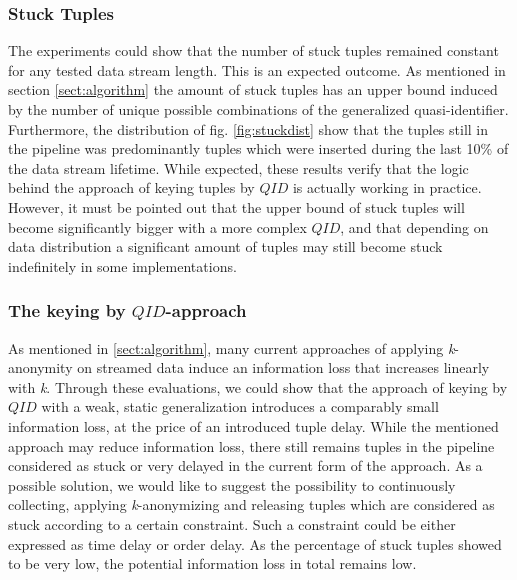 \subsubsection{Stuck Tuples} %
The experiments could show that the number of stuck tuples remained constant for any tested data stream length. This is an expected outcome. As mentioned in section \ref{sect:algorithm} the amount of stuck tuples has an upper bound induced by the number of unique possible combinations of the generalized quasi-identifier. Furthermore, the distribution of fig. \ref{fig:stuckdist} show that the tuples still in the pipeline was predominantly tuples which were inserted during the last 10\% of the data stream lifetime. While expected, these results verify that the logic behind the approach of keying tuples by $QID$ is actually working in practice. However, it must be pointed out that the upper bound of stuck tuples will become significantly bigger with a more complex $QID$, and that depending on data distribution a significant amount of tuples may still become stuck indefinitely in some implementations. 

\subsubsection{The keying by $QID$-approach} %
As mentioned in \ref{sect:algorithm}, many current approaches of applying \textit{k}-anonymity on streamed data induce an information loss that increases linearly with \textit{k}. Through these evaluations, we could show that the approach of keying by $QID$ with a weak, static generalization introduces a comparably small information loss, at the price of an introduced tuple delay. While the mentioned approach may reduce information loss, there still remains tuples in the pipeline considered as stuck or very delayed in the current form of the approach. As a possible solution, we would like to suggest the possibility to continuously collecting, applying \textit{k}-anonymizing and releasing tuples which are considered as stuck according to a certain constraint. Such a constraint could be either expressed as time delay or order delay. As the percentage of stuck tuples showed to be very low, the potential information loss in total remains low. 

